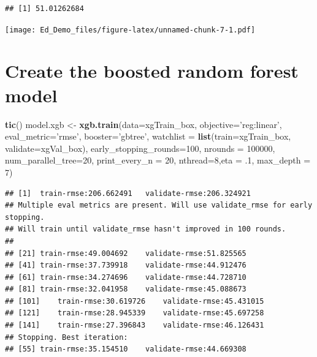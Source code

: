\documentclass[]{article}
\newenvironment{Shaded}{\begin{snugshade}}{\end{snugshade}}
\newcommand{\KeywordTok}[1]{\textcolor[rgb]{0.13,0.29,0.53}{\textbf{#1}}}
\newcommand{\DataTypeTok}[1]{\textcolor[rgb]{0.13,0.29,0.53}{#1}}
\newcommand{\DecValTok}[1]{\textcolor[rgb]{0.00,0.00,0.81}{#1}}
\newcommand{\FloatTok}[1]{\textcolor[rgb]{0.00,0.00,0.81}{#1}}
\newcommand{\StringTok}[1]{\textcolor[rgb]{0.31,0.60,0.02}{#1}}
\newcommand{\OperatorTok}[1]{\textcolor[rgb]{0.81,0.36,0.00}{\textbf{#1}}}
\newcommand{\NormalTok}[1]{#1}
\begin{document}
\begin{verbatim}
## [1] 51.01262684
\end{verbatim}

\begin{Shaded}
\end{Shaded}

\texttt{[image: Ed\_Demo\_files/figure-latex/unnamed-chunk-7-1.pdf]}

\section{Create the boosted random forest
model}\label{create-the-boosted-random-forest-model}

\begin{Shaded}
\begin{Highlighting}[]
\KeywordTok{tic}\NormalTok{()}
\NormalTok{model.xgb <-}\StringTok{ }\KeywordTok{xgb.train}\NormalTok{(}\DataTypeTok{data=}\NormalTok{xgTrain_box, }\DataTypeTok{objective=}\StringTok{'reg:linear'}\NormalTok{, }\DataTypeTok{eval_metric=}\StringTok{'rmse'}\NormalTok{, }\DataTypeTok{booster=}\StringTok{'gbtree'}\NormalTok{, }\DataTypeTok{watchlist =} \KeywordTok{list}\NormalTok{(}\DataTypeTok{train=}\NormalTok{xgTrain_box, }\DataTypeTok{validate=}\NormalTok{xgVal_box), }
                  \DataTypeTok{early_stopping_rounds=}\DecValTok{100}\NormalTok{, }\DataTypeTok{nrounds =} \DecValTok{100000}\NormalTok{, }\DataTypeTok{num_parallel_tree=}\DecValTok{20}\NormalTok{, }\DataTypeTok{print_every_n =} \DecValTok{20}\NormalTok{, }\DataTypeTok{nthread=}\DecValTok{8}\NormalTok{,}\DataTypeTok{eta =}\NormalTok{ .}\DecValTok{1}\NormalTok{, }\DataTypeTok{max_depth =} \DecValTok{7}\NormalTok{)}
\end{Highlighting}
\end{Shaded}

\begin{verbatim}
## [1]  train-rmse:206.662491   validate-rmse:206.324921 
## Multiple eval metrics are present. Will use validate_rmse for early stopping.
## Will train until validate_rmse hasn't improved in 100 rounds.
## 
## [21] train-rmse:49.004692    validate-rmse:51.825565 
## [41] train-rmse:37.739918    validate-rmse:44.912476 
## [61] train-rmse:34.274696    validate-rmse:44.728710 
## [81] train-rmse:32.041958    validate-rmse:45.088673 
## [101]    train-rmse:30.619726    validate-rmse:45.431015 
## [121]    train-rmse:28.945339    validate-rmse:45.697258 
## [141]    train-rmse:27.396843    validate-rmse:46.126431 
## Stopping. Best iteration:
## [55] train-rmse:35.154510    validate-rmse:44.669308
\end{verbatim}
\end{document}
